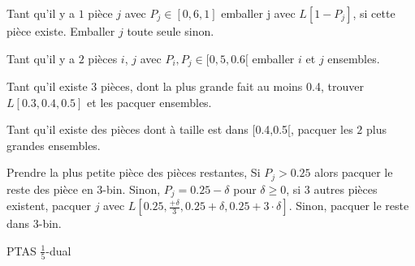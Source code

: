 \documentclass[a4paper,12pt]{report}
\theoremstyle{plain}				%
\theoremstyle{definition}				%
\begin{document}
\begin{algorithm}[H]
\DontPrintSemicolon

Tant qu'il y a $1$ pièce $j$ avec $P_j \in [0,6, 1]$ emballer j avec $L[1 - P_j]$, si cette pièce existe. Emballer $j$ toute seule sinon.

\BlankLine %
Tant qu'il y a $2$ pièces $i$, $j$ avec $P_i, P_j \in [0,5, 0.6[$ emballer $i$ et $j$ ensembles.

\BlankLine %
Tant qu'il existe $3$ pièces, dont la plus grande fait au moins 0.4, trouver $L[0.3,0.4,0.5]$ et les pacquer ensembles.

\BlankLine %
Tant qu'il existe des pièces dont à taille est dans [0.4,0.5[, pacquer les $2$ plus grandes ensembles.

\BlankLine %
Prendre la plus petite pièce des pièces restantes, Si $P_j > 0.25$
alors pacquer le reste des pièce en 3-bin.
Sinon, $P_j = 0.25 - \delta$ pour $\delta \geq 0$,
 si $3$ autres pièces existent, pacquer $j$
 avec $L[0.25, \frac{+\delta}{3}, 0.25 + \delta, 0.25 + 3 \cdot \delta]$.
Sinon, pacquer le reste dans 3-bin.


\caption{PTAS $\frac{1}{5}$-dual}
\label{algo:PTASDual1_5}
\end{algorithm}

\bigskip
\end{document}
